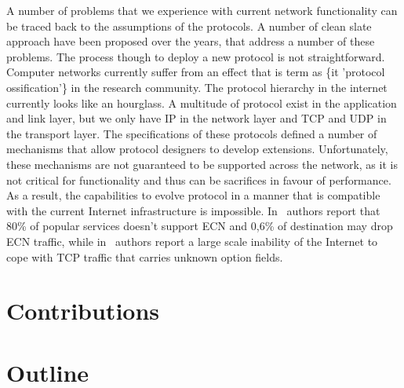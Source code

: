 A number of problems that we experience with current network functionality can
be traced back to the assumptions of the protocols. A number of clean slate
approach have been proposed over the years, that address a number of these
problems. The process though to deploy a new protocol is not straightforward.
Computer networks currently suffer from an effect that is term as \{it 'protocol
  ossification'\} in the research community. The protocol hierarchy in the
internet currently looks like an hourglass. A multitude of
protocol exist in the application and link layer, but we only have IP in the network
layer and TCP and UDP in the transport layer. The specifications of these
protocols defined a number of mechanisms that allow protocol designers to develop
extensions.  Unfortunately, these mechanisms are not guaranteed to be supported
across the network, as it is not critical for functionality and thus
can be sacrifices in favour of performance. As a result, the capabilities to
evolve protocol in a manner that is compatible with the current Internet
infrastructure is impossible. In~\cite{Bauer:2011ws} authors report that 80\% of
popular services doesn't support ECN and 0,6\% of destination may drop ECN
traffic, while in~\cite{Honda:2011ci} authors report a large scale inability of
the Internet to cope with TCP traffic that carries unknown option fields. 



\section{Contributions} \label{sec:intro:contributions}

\section{Outline} \label{sec:intro:outline}

